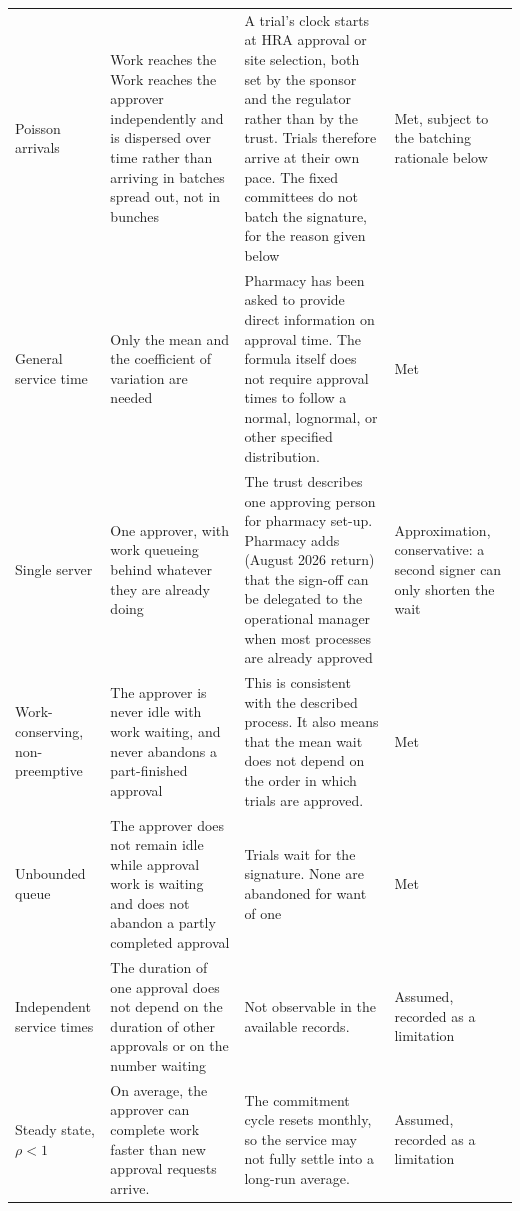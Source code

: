 {\begin{xltabular}{\textwidth}{@{}P{0.17\textwidth}>{\hsize}L>{\hsize}LP{0.17\textwidth}@{}}
    Poisson arrivals &
      Work reaches the Work reaches the approver independently and is
      dispersed over time rather than arriving in batches spread out, not in
      bunches &
      A trial's clock starts at HRA approval or site selection, both set by
      the sponsor and the regulator rather than by the trust. Trials therefore
      arrive at their own pace. The fixed committees do not batch the
      signature, for the reason given below &
      Met, subject to the batching rationale below \\
    \addlinespace
    General service time &
      Only the mean and the coefficient of variation are needed &
      Pharmacy has been asked to provide direct information on approval time.
      The formula itself does not require approval times to follow a normal,
      lognormal, or other specified distribution. &
      Met \\
    \addlinespace
    Single server &
      One approver, with work queueing behind whatever they are already doing &
      The trust describes one approving person for pharmacy set-up. Pharmacy
      adds (August 2026 return) that the sign-off can be delegated to the
      operational manager when most processes are already approved &
      Approximation, conservative: a second signer can only shorten the wait \\
    \addlinespace
    Work-conserving, non-preemptive &
      The approver is never idle with work waiting, and never abandons a
      part-finished approval &
      This is consistent with the described process. It also means that the
      mean wait does not depend on the order in which trials are approved. &
      Met \\
    \addlinespace
    Unbounded queue &
      The approver does not remain idle while approval work is waiting and
      does not abandon a partly completed approval &
      Trials wait for the signature. None are abandoned for want of one &
      Met \\
    \addlinespace
    Independent service times &
      The duration of one approval does not depend on the duration of other
      approvals or on the number waiting &
      Not observable in the available records. &
      Assumed, recorded as a limitation \\
    \addlinespace
    Steady state, $\rho < 1$ &
      On average, the approver can complete work faster than new approval
      requests arrive. &
      The commitment cycle resets monthly, so the service may not fully settle
      into a long-run average. &
      Assumed, recorded as a limitation 
\end{xltabular}}


